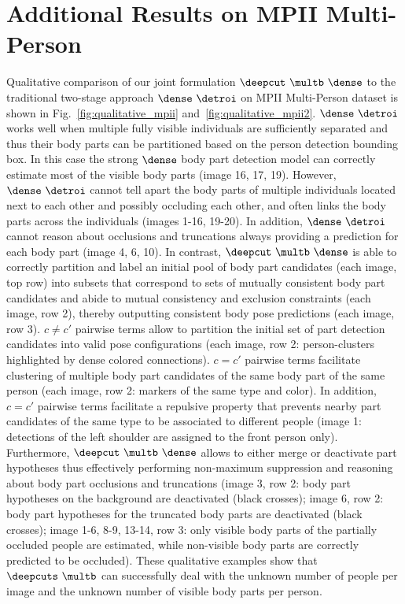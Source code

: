 \section{Additional Results on MPII Multi-Person}
Qualitative comparison of our joint formulation
$\deepcut~\multb~\dense$ to the traditional two-stage approach
$\dense~\detroi$ on MPII Multi-Person dataset is shown in
Fig.~\ref{fig:qualitative_mpii} and~\ref{fig:qualitative_mpii2}.
$\dense~\detroi$ works well when multiple fully visible individuals
are sufficiently separated and thus their body parts can be
partitioned based on the person detection bounding box. In this case
the strong $\dense$ body part detection model can correctly estimate
most of the visible body parts (image 16, 17, 19). However,
$\dense~\detroi$ cannot tell apart the body parts of multiple
individuals located next to each other and possibly occluding each
other, and often links the body parts across the individuals (images 1-16,
19-20). In addition, $\dense~\detroi$ cannot reason about occlusions
and truncations always providing a prediction for each body part
(image 4, 6, 10). In contrast, $\deepcut~\multb~\dense$ is able to
correctly partition and label an initial pool of body part candidates
(each image, top row) into subsets that correspond to sets of mutually
consistent body part candidates and abide to mutual consistency and
exclusion constraints (each image, row 2), thereby outputting
consistent body pose predictions (each image, row 3). $c \neq c'$
pairwise terms allow to partition the initial set of part detection
candidates into valid pose configurations (each image, row 2:
person-clusters highlighted by dense colored connections). $c = c'$
pairwise terms facilitate clustering of multiple body part candidates
of the same body part of the same person (each image, row 2: markers
of the same type and color). In addition, $c = c'$ pairwise terms
facilitate a repulsive property that prevents nearby part candidates
of the same type to be associated to different people (image 1:
detections of the left shoulder are assigned to the front person
only). Furthermore, $\deepcut~\multb~\dense$ allows to either merge
or deactivate part hypotheses thus effectively performing non-maximum
suppression and reasoning about body part occlusions and truncations
(image 3, row 2: body part hypotheses on the background are
deactivated (black crosses); image 6, row 2: body part hypotheses for
the truncated body parts are deactivated (black crosses); image 1-6,
8-9, 13-14, row 3: only visible body parts of the partially occluded
people are estimated, while non-visible body parts are correctly
predicted to be occluded). These qualitative examples show that
$\deepcuts~\multb$ can successfully deal with the unknown number of
people per image and the unknown number of visible body parts per
person.


